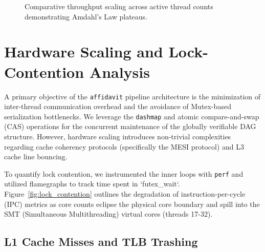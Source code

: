 \begin{figure}[htbp]
\centering
{}
\caption{Comparative throughput scaling across active thread counts demonstrating Amdahl's Law plateaus.}
\label{fig:throughput_scaling}
\end{figure}

\section{Hardware Scaling and Lock-Contention Analysis}
\label{sec:eval_lock_contention}

A primary objective of the \texttt{affidavit} pipeline architecture is the minimization of inter-thread communication overhead and the avoidance of Mutex-based serialization bottlenecks. We leverage the \texttt{dashmap} and atomic compare-and-swap (CAS) operations for the concurrent maintenance of the globally verifiable DAG structure. However, hardware scaling introduces non-trivial complexities regarding cache coherency protocols (specifically the MESI protocol) and L3 cache line bouncing.

To quantify lock contention, we instrumented the inner loops with \texttt{perf} and utilized flamegraphs to track time spent in `futex_wait`. Figure~\ref{fig:lock_contention} outlines the degradation of instruction-per-cycle (IPC) metrics as core counts eclipse the physical core boundary and spill into the SMT (Simultaneous Multithreading) virtual cores (threads 17-32).

\subsection{L1 Cache Misses and TLB Trashing}

